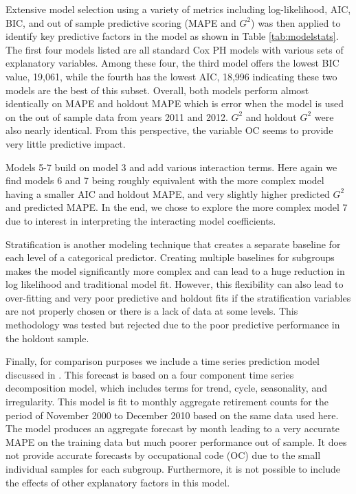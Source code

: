 \documentclass[12pt,letterpaper]{article}
\begin{document}
Extensive model selection using a variety of metrics including log-likelihood, AIC, BIC, and out of sample predictive scoring (MAPE and $G^2$) was then applied to identify key predictive factors in the model as shown in Table \ref{tab:modelstats}. %
The first four models listed are all standard Cox PH models with various sets of explanatory variables.  Among these four, the third model offers the lowest BIC value, 19,061, while the fourth has the lowest AIC, 18,996 indicating these two models are the best of this subset.  Overall, both models perform almost identically on MAPE and holdout MAPE which is error when the model is used on the out of sample data from years 2011 and 2012. $G^2$ and holdout $G^2$ were also nearly identical.  From this perspective, the variable OC seems to provide very little predictive impact.

Models 5-7 build on model 3 and add various interaction terms.  Here again we find models 6 and 7 being roughly equivalent with the more complex model having a smaller AIC and holdout MAPE, and very slightly higher predicted $G^2$ and predicted MAPE.  In the end, we chose to explore the more complex model 7 due to interest in interpreting the interacting model coefficients.

Stratification is another modeling technique that creates a separate baseline for each level of a categorical predictor.  Creating multiple baselines for subgroups makes the model significantly more complex and can lead to a huge reduction in log likelihood and traditional model fit.  However, this flexibility can also lead to over-fitting and very poor predictive and holdout fits if the stratification variables are not properly chosen or there is a lack of data at some levels.  This methodology was tested but rejected due to the poor predictive performance in the holdout sample.

Finally, for comparison purposes we include a time series prediction model discussed in \cite{zhu2015}.  This forecast is based on a four component time series decomposition model, which includes terms for trend, cycle, seasonality, and irregularity.  This model is fit to monthly aggregate retirement counts for the period of November 2000 to December 2010 based on the same data used here. The model produces an aggregate forecast by month leading to a very accurate MAPE on the training data but much poorer performance out of sample. It does not provide accurate forecasts by occupational code (OC) due to the small individual samples for each subgroup. Furthermore, it is not possible to include the effects of other explanatory factors in this model.
\end{document}
